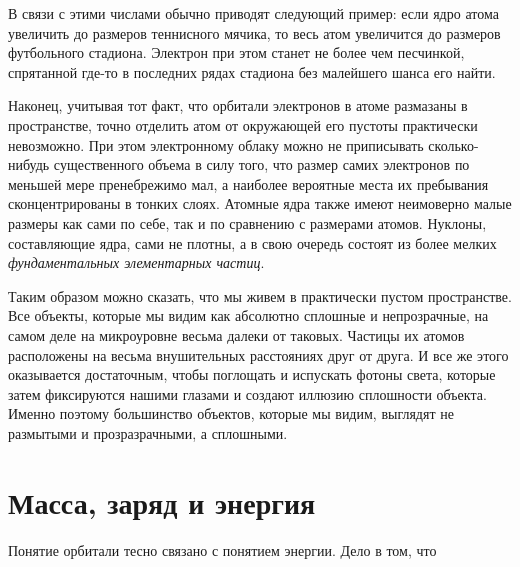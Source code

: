 В связи с этими числами обычно приводят следующий пример: если ядро атома увеличить до размеров теннисного мячика, то весь атом увеличится до размеров футбольного стадиона.
Электрон при этом станет не более чем песчинкой, спрятанной где-то в последних рядах стадиона без малейшего шанса его найти.

Наконец, учитывая тот факт, что орбитали электронов в атоме размазаны в пространстве, точно отделить атом от окружающей его пустоты практически невозможно.
При этом электронному облаку можно не приписывать сколько-нибудь существенного объема в силу того, что размер самих электронов по меньшей мере пренебрежимо мал, а наиболее вероятные места их пребывания сконцентрированы в тонких слоях.
Атомные ядра также имеют неимоверно малые размеры как сами по себе, так и по сравнению с размерами атомов.
Нуклоны, составляющие ядра, сами не плотны, а в свою очередь состоят из более мелких \textit{фундаментальных элементарных частиц}.

Таким образом можно сказать, что мы живем в практически пустом пространстве.
Все объекты, которые мы видим как абсолютно сплошные и непрозрачные, на самом деле на микроуровне весьма далеки от таковых.
Частицы их атомов расположены на весьма внушительных расстояниях друг от друга.
И все же этого оказывается достаточным, чтобы поглощать и испускать фотоны света, которые затем фиксируются нашими глазами и создают иллюзию сплошности объекта. 
Именно поэтому большинство объектов, которые мы видим, выглядят не размытыми и прозразрачными, а сплошными.


\section*{Масса, заряд и энергия}

Понятие орбитали тесно связано с понятием энергии.
Дело в том, что 

